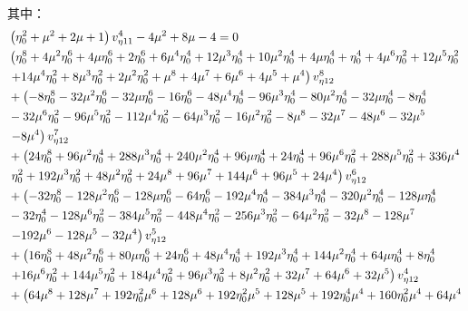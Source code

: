 其中：
    \begin{align}
    &\left(\eta_0^2+\mu^2+2\mu+1\right)v_{\eta11}^4-4\mu^2+8\mu-4=0
    \\
    &\left(\eta_0^8+4 \mu ^2 \eta_0^6+4 \mu  \eta_0^6+2 \eta_0^6+6 \mu ^4 \eta_0^4+12 \mu ^3 \eta_0^4+10 \mu ^2 \eta_0^4+4 \mu  \eta_0^4+\eta_0^4+4 \mu ^6 \eta_0^2+12 \mu ^5 \eta_0^2\right.
    \notag\\
    &\left.+14 \mu ^4 \eta_0^2+8 \mu ^3 \eta_0^2+2 \mu ^2 \eta_0^2+\mu ^8+4 \mu ^7+6 \mu ^6+4 \mu ^5+\mu ^4\right) v_{\eta12}^8
    \notag\\
    &+\left(-8 \eta_0^8-32 \mu ^2 \eta_0^6-32 \mu  \eta_0^6-16 \eta_0^6-48 \mu ^4 \eta_0^4-96 \mu ^3 \eta_0^4-80 \mu ^2 \eta_0^4-32 \mu  \eta_0^4-8 \eta_0^4\right.
    \notag\\
    &-32 \mu ^6 \eta_0^2-96 \mu ^5 \eta_0^2-112 \mu ^4 \eta_0^2-64 \mu ^3 \eta_0^2-16 \mu ^2 \eta_0^2-8 \mu ^8-32 \mu ^7-48 \mu ^6-32 \mu ^5
    \notag\\
    &\left.-8 \mu ^4\right) v_{\eta12}^7
    \notag\\
    &+\left(24 \eta_0^8+96 \mu ^2 \eta_0^4+288 \mu ^3 \eta_0^4+240 \mu ^2 \eta_0^4+96 \mu  \eta_0^4+24 \eta_0^4+96 \mu ^6 \eta_0^2+288 \mu ^5 \eta_0^2+336 \mu ^4\right.
    \notag\\
    &\left. \eta_0^2+192 \mu ^3 \eta_0^2+48 \mu ^2 \eta_0^2+24 \mu ^8+96 \mu ^7+144 \mu ^6+96 \mu ^5+24 \mu ^4\right) v_{\eta12}^6
    \notag\\
    &+\left(-32 \eta_0^8-128 \mu ^2 \eta_0^6-128 \mu  \eta_0^6-64 \eta_0^6-192 \mu ^4 \eta_0^4-384 \mu ^3 \eta_0^4-320 \mu ^2 \eta_0^4-128 \mu  \eta_0^4\right.
    \notag\\
    &-32 \eta_0^4-128 \mu ^6 \eta_0^2-384 \mu ^5 \eta_0^2-448 \mu ^4 \eta_0^2-256 \mu ^3 \eta_0^2-64 \mu ^2 \eta_0^2-32 \mu ^8-128 \mu ^7
    \notag\\
    &\left.-192 \mu ^6-128 \mu ^5-32 \mu ^4\right) v_{\eta12}^5
    \notag\\
    &+\left(16 \eta_0^8+48 \mu ^2 \eta_0^6+80 \mu  \eta_0^6+24 \eta_0^6+48 \mu ^4 \eta_0^4+192 \mu ^3 \eta_0^4+144 \mu ^2 \eta_0^4+64 \mu  \eta_0^4+8 \eta_0^4\right.
    \notag\\
    &\left.+16 \mu ^6 \eta_0^2+144 \mu ^5 \eta_0^2+184 \mu ^4 \eta_0^2+96 \mu ^3 \eta_0^2+8 \mu ^2 \eta_0^2+32 \mu ^7+64 \mu ^6+32 \mu ^5\right) v_{\eta12}^4
    \notag\\
    &+\left(64 \mu ^8+128 \mu ^7+192 \eta_0^2 \mu ^6+128 \mu ^6+192 \eta_0^2 \mu ^5+128 \mu ^5+192 \eta_0^4 \mu ^4+160 \eta_0^2 \mu ^4+64 \mu ^4\right.

\end{align}
